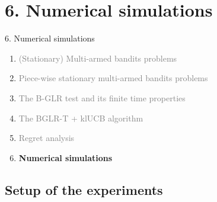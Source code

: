 \documentclass[11pt,english,ignorenonframetext,]{beamer}
\begin{document}
\section{\hfill{}6. Numerical simulations\hfill{}}

\begin{frame}{6. Numerical simulations}

  \begin{enumerate}
    \item
    \textcolor{gray}{
      (Stationary) Multi-armed bandits problems
    }
    \vspace*{15pt}

    \item
    \textcolor{gray}{
      Piece-wise stationary multi-armed bandits problems
    }
    \vspace*{15pt}

    \item
    \textcolor{gray}{
      The B-GLR test and its finite time properties
    }
    \vspace*{15pt}

    \item
    \textcolor{gray}{
      The BGLR-T + klUCB algorithm
    }
    \vspace*{15pt}

    \item
    \textcolor{gray}{
      Regret analysis
    }
    \vspace*{15pt}

    \item
    \alert{\textbf{%
      Numerical simulations
    }}
  \end{enumerate}

\end{frame}


\subsection{\hfill{}Setup of the experiments\hfill{}}
\end{document}
